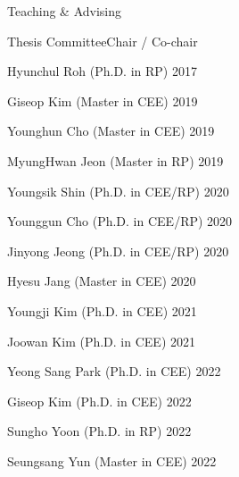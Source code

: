 \begin{rSection}{Teaching \& Advising}

\begin{rSubsection}{Thesis Committee}{}{Chair / Co-chair }{}
  \item Hyunchul Roh (Ph.D. in \ac{RP}) \hfill 2017
  \item Giseop Kim (Master in \ac{CEE}) \hfill 2019
  \item Younghun Cho (Master in \ac{CEE}) \hfill 2019
  \item MyungHwan Jeon (Master in \ac{RP}) \hfill 2019
  \item Youngsik Shin (Ph.D. in \ac{CEE}/\ac{RP}) \hfill 2020
  \item Younggun Cho (Ph.D. in \ac{CEE}/\ac{RP}) \hfill 2020
  \item Jinyong Jeong (Ph.D. in \ac{CEE}/\ac{RP}) \hfill 2020
  \item Hyesu Jang (Master in \ac{CEE}) \hfill 2020
  \item Youngji Kim (Ph.D. in \ac{CEE}) \hfill 2021
  \item Joowan Kim (Ph.D. in \ac{CEE}) \hfill 2021
  \item Yeong Sang Park (Ph.D. in \ac{CEE}) \hfill 2022
  \item Giseop Kim (Ph.D. in \ac{CEE}) \hfill 2022
  \item Sungho Yoon (Ph.D. in \ac{RP}) \hfill 2022
  \item Seungsang Yun (Master in \ac{CEE}) \hfill 2022
\end{rSubsection}

\end{rSection}
